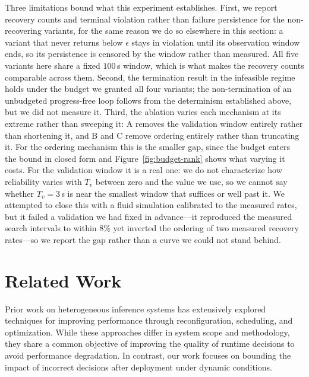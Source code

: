 \documentclass[conference]{IEEEtran}
\begin{document}
{{Three limitations bound what this experiment establishes. First, we report recovery counts and terminal violation rather than failure persistence for the non-recovering variants, for the same reason we do so elsewhere in this section: a variant that never returns below $\epsilon$ stays in violation until its observation window ends, so its persistence is censored by the window rather than measured. All five variants here share a fixed $100$\,s window, which is what makes the recovery counts comparable across them. Second, the termination result in the infeasible regime holds under the budget we granted all four variants; the non-termination of an unbudgeted progress-free loop follows from the determinism established above, but we did not measure it. Third, the ablation varies each mechanism at its extreme rather than sweeping it: A removes the validation window entirely rather than shortening it, and B and C remove ordering entirely rather than truncating it. For the ordering mechanism this is the smaller gap, since the budget enters the bound in closed form and Figure~\ref{fig:budget-rank} shows what varying it costs. For the validation window it is a real one: we do not characterize how reliability varies with $T_v$ between zero and the value we use, so we cannot say whether $T_v=3$\,s is near the smallest window that suffices or well past it. We attempted to close this with a fluid simulation calibrated to the measured rates, but it failed a validation we had fixed in advance---it reproduced the measured search intervals to within $8\%$ yet inverted the ordering of two measured recovery rates---so we report the gap rather than a curve we could not stand behind.}


\section{Related Work}

Prior work on heterogeneous inference systems has extensively explored techniques for improving performance through reconfiguration, scheduling, and optimization.
While these approaches differ in system scope and methodology, they share a common objective of improving the quality of runtime decisions to avoid performance degradation.
In contrast, our work focuses on bounding the impact of incorrect decisions after deployment under dynamic conditions.


}
\end{document}
